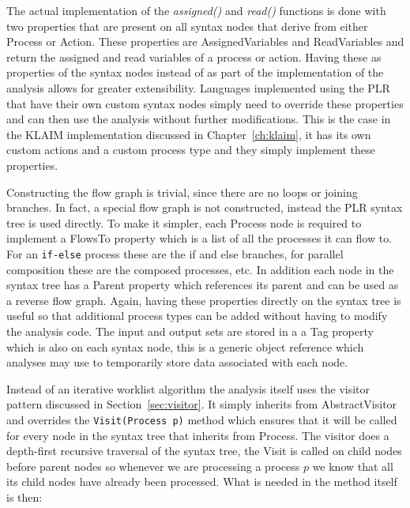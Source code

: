   The actual implementation of the \textit{assigned()} and \textit{read()} 
  functions is done with two properties that are present on all syntax nodes
  that derive from either \textsf{Process} or \textsf{Action}. These properties
  are \textsf{AssignedVariables} and \textsf{ReadVariables} and return the
  assigned and read variables of a process or action. Having these as 
  properties of the syntax nodes instead of as part of the implementation of 
  the analysis allows for greater extensibility. Languages implemented using 
  the PLR that have their own custom syntax nodes simply need to override 
  these properties and can then use the analysis without further 
  modifications. This is the case in the KLAIM implementation discussed in 
  Chapter~\ref{ch:klaim}, it has its own custom actions and a custom process 
  type and they simply implement these properties.
  
  Constructing the flow graph is trivial, since there are no loops or joining
  branches. In fact, a special flow graph is not constructed, instead the PLR
  syntax tree is used directly. To make it simpler, each \textsf{Process} node
  is required to implement a \textsf{FlowsTo} property which is a list of all
  the processes it can flow to. For an \texttt{if-else} process these are the 
  if and else branches, for parallel composition these are the composed 
  processes, etc. In addition each node in the syntax tree has a \textsf{Parent} 
  property which references its parent and can be used as a reverse flow graph.
  Again, having these properties directly on the syntax tree is useful so
  that additional process types can be added without having to modify the
  analysis code. The input and output sets are stored in a a \textsf{Tag} 
  property which is also on each syntax node, this is a generic object 
  reference which analyses may use to temporarily store data associated with 
  each node.
  
  Instead of an iterative worklist algorithm the analysis itself uses the
  visitor pattern discussed in Section~\ref{sec:visitor}. It simply inherits
  from \textsf{AbstractVisitor} and overrides the \texttt{Visit(Process p)} 
  method which ensures that it will be called for every node in the syntax 
  tree that inherits from \textsf{Process}. The visitor does a depth-first 
  recursive traversal of  the syntax tree, the \textsf{Visit} is called on 
  child nodes before parent nodes so whenever we are processing a process $p$ 
  we know that all its child nodes have already been processed. What is needed
  in the method itself is then:
  
